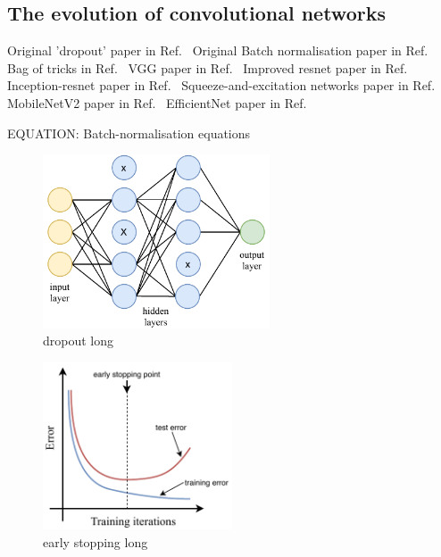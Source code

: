 \subsection{The evolution of convolutional networks} %
\label{sec:cvn_theory_architectures} %

Original 'dropout' paper in Ref.~\cite{hinton2012}
Original Batch normalisation paper in Ref.~\cite{ioffe2015}
Bag of tricks in Ref.~\cite{he2018}
VGG paper in Ref.~\cite{simonyan2014}
Improved resnet paper in Ref.~\cite{he2016}
Inception-resnet paper in Ref.~\cite{szegedy2016}
Squeeze-and-excitation networks paper in Ref.~\cite{hu2017}
MobileNetV2 paper in Ref.~\cite{sandler2018}
EfficientNet paper in Ref.~\cite{tan2019}

EQUATION: Batch-normalisation equations

\begin{figure} %
    \includegraphics[width=0.6\textwidth]{diagrams/7-cvn/dropout.pdf}
    \caption[dropout short]
    {dropout long}
    \label{fig:dropout}
\end{figure}

\begin{figure} %
    \includegraphics[width=0.5\textwidth]{diagrams/7-cvn/early_stopping.pdf}
    \caption[early stopping short]
    {early stopping long}
    \label{fig:early_stopping}
\end{figure}

